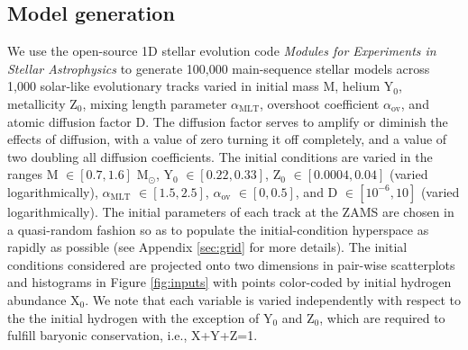 \documentclass[manuscript]{aastex}
\begin{document}
\subsection{Model generation}
\label{sec:models}
We use the open-source 1D stellar evolution code \emph{Modules for Experiments in Stellar Astrophysics} \citep[MESA,][]{2015ApJS..220...15P} to generate 100,000 main-sequence stellar models across 1,000 solar-like evolutionary tracks varied in initial mass M, helium Y$_0$, metallicity Z$_0$, mixing length parameter $\alpha_{\text{MLT}}$, overshoot coefficient $\alpha_{\text{ov}}$, and atomic diffusion factor D. The diffusion factor serves to amplify or diminish the effects of diffusion, with a value of zero turning it off completely, and a value of two doubling all diffusion coefficients. The initial conditions are varied in the ranges M $\in [0.7, 1.6]$ M$_\odot$, Y$_0$ $\in [0.22, 0.33]$, Z$_0$ $\in [0.0004, 0.04]$ (varied logarithmically), $\alpha_{\text{MLT}}$ $\in [1.5, 2.5]$, $\alpha_{\text{ov}}$ $\in [0, 0.5]$, and D $\in [10^{-6}, 10]$ (varied logarithmically). The initial parameters of each track at the ZAMS are chosen in a quasi-random fashion so as to populate the initial-condition hyperspace as rapidly as possible (see Appendix \ref{sec:grid} for more details). The initial conditions considered are projected onto two dimensions in pair-wise scatterplots and histograms in Figure \ref{fig:inputs} with points color-coded by initial hydrogen abundance X$_0$. We note that each variable is varied independently with respect to the the initial hydrogen with the exception of Y$_0$ and Z$_0$, which are required to fulfill baryonic conservation, i.e., X+Y+Z=1. 
\end{document}
